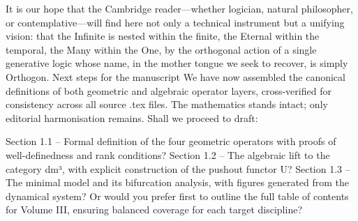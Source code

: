 It is our hope that the Cambridge reader—whether logician, natural philosopher, or contemplative—will find here not only a technical instrument but a unifying vision: that the Infinite is nested within the finite, the Eternal within the temporal, the Many within the One, by the orthogonal action of a single generative logic whose name, in the mother tongue we seek to recover, is simply Orthogon.
Next steps for the manuscript
We have now assembled the canonical definitions of both geometric and algebraic operator layers, cross-verified for consistency across all source .tex files. The mathematics stands intact; only editorial harmonisation remains. Shall we proceed to draft:

Section 1.1 – Formal definition of the four geometric operators with proofs of well-definedness and rank conditions?
Section 1.2 – The algebraic lift to the category dm³, with explicit construction of the pushout functor U?
Section 1.3 – The minimal model and its bifurcation analysis, with figures generated from the dynamical system?
Or would you prefer first to outline the full table of contents for Volume III, ensuring balanced coverage for each target discipline?

